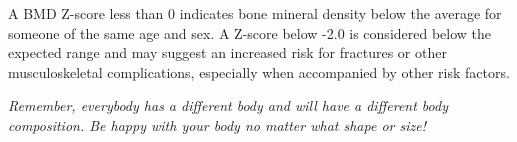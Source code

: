 A BMD Z-score less than 0 indicates bone mineral density below the average for
someone of the same age and sex. A Z-score below -2.0 is considered below the
expected range and may suggest an increased risk for fractures or other
musculoskeletal complications, especially when accompanied by other risk
factors.

\emph{
    Remember, everybody has a different body and will have a different body
    composition. Be happy with your body no matter what shape or size!
}

